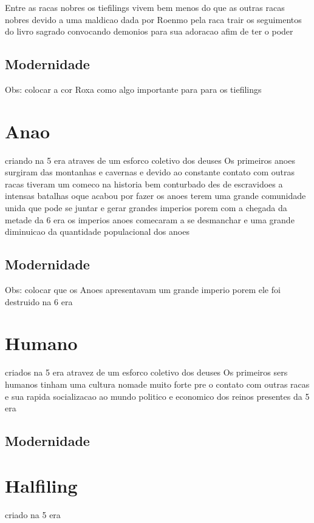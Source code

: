 \documentclass{book}
\begin{document}
Entre as racas nobres os tiefilings vivem bem menos do que as outras racas nobres devido a uma 
maldicao dada por Roenmo pela raca trair os seguimentos do livro sagrado convocando demonios 
para sua adoracao afim de ter o poder 

\subsection*{Modernidade}

Obs: colocar a cor Roxa como algo importante para para os tiefilings 

\section{Anao}
criando na 5 era atraves de um esforco coletivo dos deuses 
Os primeiros anoes surgiram das montanhas e cavernas e devido ao constante contato com outras 
racas tiveram um comeco na historia bem conturbado des de escravidoes a intensas batalhas 
oque acabou por fazer os anoes terem uma grande comunidade unida que pode se juntar e gerar 
grandes imperios porem com a chegada da metade da 6 era os imperios anoes comecaram a se 
desmanchar e uma grande diminuicao da quantidade populacional dos anoes 

\subsection*{Modernidade}

Obs: colocar que os Anoes apresentavam um grande imperio porem ele foi destruido na 6 era 

\section{Humano}
criados na 5 era atravez de um esforco coletivo dos deuses 
Os primeiros sers humanos tinham uma cultura nomade muito forte pre o contato com outras racas 
e sua rapida socializacao ao mundo politico e economico dos reinos presentes da 5 era

\subsection{Modernidade}

\section{Halfiling}
criado na 5 era 
\end{document}
